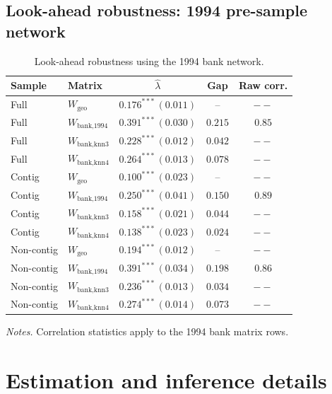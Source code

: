 \subsection{Look-ahead robustness: 1994 pre-sample network}
\begin{table}[htbp]
  \centering
  \caption{Look-ahead robustness using the 1994 bank network.}
  \label{tab:w1994}
  \footnotesize
  \begin{tabular}{llccc}
    \toprule
    Sample & Matrix & $\hat\lambda$ & Gap & Raw corr. \\
    \midrule
    Full & $W_{\text{geo}}$ & $0.176^{***}\,(0.011)$ & -- & $--$ \\
    Full & $W_{\text{bank,1994}}$ & $0.391^{***}\,(0.030)$ & $0.215$ & $0.85$ \\
    Full & $W_{\text{bank,knn3}}$ & $0.228^{***}\,(0.012)$ & $0.042$ & $--$ \\
    Full & $W_{\text{bank,knn4}}$ & $0.264^{***}\,(0.013)$ & $0.078$ & $--$ \\
    \addlinespace
    Contig & $W_{\text{geo}}$ & $0.100^{***}\,(0.023)$ & -- & $--$ \\
    Contig & $W_{\text{bank,1994}}$ & $0.250^{***}\,(0.041)$ & $0.150$ & $0.89$ \\
    Contig & $W_{\text{bank,knn3}}$ & $0.158^{***}\,(0.021)$ & $0.044$ & $--$ \\
    Contig & $W_{\text{bank,knn4}}$ & $0.138^{***}\,(0.023)$ & $0.024$ & $--$ \\
    \addlinespace
    Non-contig & $W_{\text{geo}}$ & $0.194^{***}\,(0.012)$ & -- & $--$ \\
    Non-contig & $W_{\text{bank,1994}}$ & $0.391^{***}\,(0.034)$ & $0.198$ & $0.86$ \\
    Non-contig & $W_{\text{bank,knn3}}$ & $0.236^{***}\,(0.013)$ & $0.034$ & $--$ \\
    Non-contig & $W_{\text{bank,knn4}}$ & $0.274^{***}\,(0.014)$ & $0.073$ & $--$ \\
    \bottomrule
  \end{tabular}
  \begin{tablenotes}\footnotesize
  \item \emph{Notes.} Correlation statistics apply to the 1994 bank matrix rows.
  \end{tablenotes}
\end{table}

\section{Estimation and inference details}
\label{app:details}

